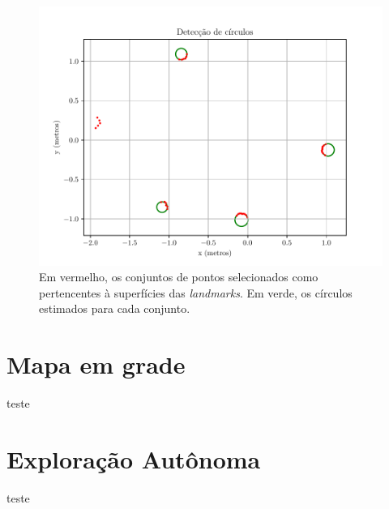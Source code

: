 \begin{figure}[h]
  \centering
  \includegraphics[width=.8\textwidth]{figs/circle_detection.pdf}
  \caption{Em vermelho, os conjuntos de pontos selecionados como pertencentes à superfícies das \textit{landmarks}. Em verde, os círculos 
  estimados para cada conjunto.}
  \label{fig:detected-circles}
\end{figure}

\section{Mapa em grade}
teste

\section{Exploração Autônoma}
teste

